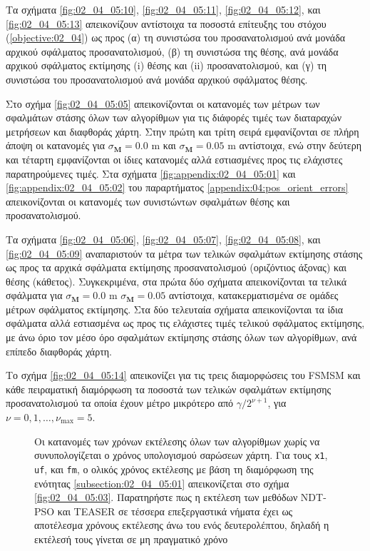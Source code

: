 Τα σχήματα \ref{fig:02_04_05:10}, \ref{fig:02_04_05:11}, \ref{fig:02_04_05:12},
και \ref{fig:02_04_05:13} απεικονίζουν αντίστοιχα τα ποσοστά επίτευξης του στόχου
(\ref{objective:02_04}) ως προς (α) τη συνιστώσα του προσανατολισμού ανά μονάδα
αρχικού σφάλματος προσανατολισμού, (β) τη συνιστώσα της θέσης, ανά μονάδα
αρχικού σφάλματος εκτίμησης (i) θέσης και (ii) προσανατολισμού, και (γ)
τη συνιστώσα του προσανατολισμού ανά μονάδα αρχικού σφάλματος θέσης.

Στο σχήμα \ref{fig:02_04_05:05} απεικονίζονται οι κατανομές των μέτρων των
σφαλμάτων στάσης όλων των αλγορίθμων για τις διάφορές τιμές των διαταραχών
μετρήσεων και διαφθοράς χάρτη. Στην πρώτη και τρίτη σειρά εμφανίζονται σε πλήρη
άποψη οι κατανομές για $\sigma_{\bm{M}} = 0.0$ m και $\sigma_{\bm{M}} = 0.05$ m
αντίστοιχα, ενώ στην δεύτερη και τέταρτη εμφανίζονται οι ίδιες κατανομές αλλά
εστιασμένες προς τις ελάχιστες παρατηρούμενες τιμές. Στα σχήματα
\ref{fig:appendix:02_04_05:01} και \ref{fig:appendix:02_04_05:02} του
παραρτήματος \ref{appendix:04:pos_orient_errors} απεικονίζονται οι κατανομές
των συνιστώντων σφαλμάτων θέσης και προσανατολισμού.

Τα σχήματα \ref{fig:02_04_05:06}, \ref{fig:02_04_05:07}, \ref{fig:02_04_05:08},
και \ref{fig:02_04_05:09} αναπαριστούν τα μέτρα των τελικών σφαλμάτων εκτίμησης
στάσης ως προς τα αρχικά σφάλματα εκτίμησης προσανατολισμού (οριζόντιος άξονας)
και θέσης (κάθετος). Συγκεκριμένα, στα πρώτα δύο σχήματα απεικονίζονται τα
τελικά σφάλματα για $\sigma_{\bm{M}} = 0.0$ m $\sigma_{\bm{M}} = 0.05$
αντίστοιχα, κατακερματισμένα σε ομάδες μέτρων σφάλματος εκτίμησης. Στα δύο
τελευταία σχήματα απεικονίζονται τα ίδια σφάλματα αλλά εστιασμένα ως προς τις
ελάχιστες τιμές τελικού σφάλματος εκτίμησης, με άνω όριο τον μέσο όρο σφαλμάτων
εκτίμησης στάσης όλων των αλγορίθμων, ανά επίπεδο διαφθοράς χάρτη.

Το σχήμα \ref{fig:02_04_05:14} απεικονίζει για τις τρεις διαμορφώσεις του FSMSM
και κάθε πειραματική διαμόρφωση τα ποσοστά των τελικών σφαλμάτων εκτίμησης
προσανατολισμού τα οποία έχουν μέτρο μικρότερο από $\gamma / 2^{\nu+1}$, για
$\nu = 0,1,\dots,\nu_{\max} = 5$.




\begin{figure}
  
  \vspace{1cm}
  \caption{\small Οι κατανομές των χρόνων εκτέλεσης όλων των αλγορίθμων χωρίς να
           συνυπολογίζεται ο χρόνος υπολογισμού σαρώσεων χάρτη. Για τους
           \texttt{x1}, \texttt{uf}, και \texttt{fm}, ο ολικός χρόνος εκτέλεσης
           με βάση τη διαμόρφωση της ενότητας \ref{subsection:02_04_05:01}
           απεικονίζεται στο σχήμα \ref{fig:02_04_05:03}. Παρατηρήστε πως η
           εκτέλεση των μεθόδων NDT-PSO και TEASER σε τέσσερα επεξεργαστικά
           νήματα έχει ως αποτέλεσμα χρόνους εκτέλεσης άνω του ενός
           δευτερολέπτου, δηλαδή η εκτέλεσή τους γίνεται σε μη πραγματικό
           χρόνο}
  \label{fig:02_04_05:02}
\end{figure}

